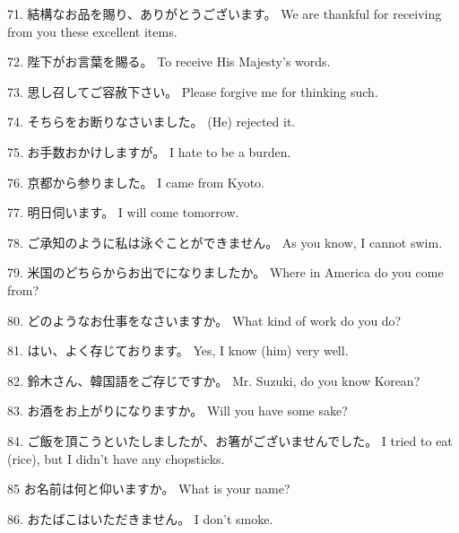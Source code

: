 \par{71. 結構なお品を賜り、ありがとうございます。 \hfill\break
We are thankful for receiving from you these excellent items. }
 
\par{72. 陛下がお言葉を賜る。 \hfill\break
To receive His Majesty's words. }
 
\par{73. 思し召してご容赦下さい。 \hfill\break
Please forgive me for thinking such. }
 
\par{74. そちらをお断りなさいました。 \hfill\break
(He) rejected it. }
 
\par{75. お手数おかけしますが。 \hfill\break
I hate to be a burden. }
 
\par{76. 京都から参りました。 \hfill\break
I came from Kyoto. }
 
\par{77. 明日伺います。 \hfill\break
I will come tomorrow. }
 
\par{78. ご承知のように私は泳ぐことができません。 \hfill\break
As you know, I cannot swim. }
 
\par{79. 米国のどちらからお出でになりましたか。 \hfill\break
Where in America do you come from? }
 
\par{80. どのようなお仕事をなさいますか。 \hfill\break
What kind of work do you do? }
 
\par{81. はい、よく存じております。 \hfill\break
Yes, I know (him) very well.  }
 
\par{82. 鈴木さん、韓国語をご存じですか。 \hfill\break
Mr. Suzuki, do you know Korean? }
 
\par{83. お酒をお上がりになりますか。 \hfill\break
Will you have some sake?  }
 
\par{84. ご飯を頂こうといたしましたが、お箸がございませんでした。 \hfill\break
I tried to eat (rice), but I didn't have any chopsticks. }
 
\par{85 お名前は何と仰いますか。 \hfill\break
What is your name? }
 
\par{86. おたばこはいただきません。 \hfill\break
I don't smoke. }

